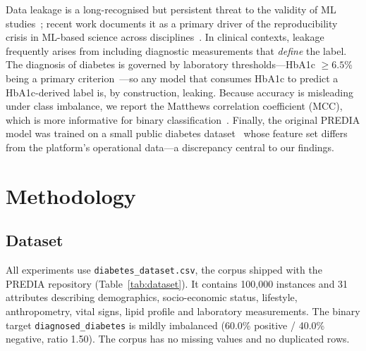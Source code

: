 \documentclass[conference]{IEEEtran}
\begin{document}
Data leakage is a long-recognised but persistent threat to the validity of ML
studies~\cite{kaufman2012leakage}; recent work documents it as a primary driver
of the reproducibility crisis in ML-based science across
disciplines~\cite{kapoor2023leakage}. In clinical contexts, leakage frequently
arises from including diagnostic measurements that \emph{define} the label. The
diagnosis of diabetes is governed by laboratory thresholds---HbA1c
$\geq 6.5\%$ being a primary criterion~\cite{ada2021classification}---so any
model that consumes HbA1c to predict a HbA1c-derived label is, by construction,
leaking. Because accuracy is misleading under class imbalance, we report the
Matthews correlation coefficient (MCC), which is more informative for binary
classification~\cite{chicco2020mcc}. Finally, the original PREDIA model was
trained on a small public diabetes dataset~\cite{rashid2020diabetes} whose
feature set differs from the platform's operational data---a discrepancy central
to our findings.

\section{Methodology}
\subsection{Dataset}
All experiments use \texttt{diabetes\_dataset.csv}, the corpus shipped with the
PREDIA repository (Table~\ref{tab:dataset}). It contains 100{,}000 instances and
31 attributes describing demographics, socio-economic status, lifestyle,
anthropometry, vital signs, lipid profile and laboratory measurements. The
binary target \texttt{diagnosed\_diabetes} is mildly imbalanced (60.0\% positive
/ 40.0\% negative, ratio 1.50). The corpus has no missing values and no
duplicated rows.


\end{document}
